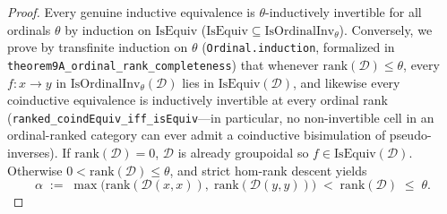 \documentclass[10pt,twoside,openright]{book}
\theoremstyle{crmplain}
\theoremstyle{crmdef}
\theoremstyle{crmremark}
\begin{document}
\begin{proof}
Every genuine inductive equivalence is $\theta$-inductively invertible for all ordinals $\theta$ by induction on $\mathrm{IsEquiv}$ ($\mathrm{IsEquiv} \subseteq \mathrm{IsOrdinalInv}_\theta$). Conversely, we prove by transfinite induction on $\theta$ (\texttt{Ordinal.induction}, formalized in \texttt{theorem9A\_\allowbreak ordinal\_\allowbreak rank\_\allowbreak completeness}) that whenever $\mathrm{rank}(\mathcal{D}) \le \theta$, every $f : x \to y$ in $\mathrm{IsOrdinalInv}_\theta(\mathcal{D})$ lies in $\mathrm{IsEquiv}(\mathcal{D})$, and likewise every coinductive equivalence is inductively invertible at every ordinal rank (\texttt{ranked\_\allowbreak coindEquiv\_\allowbreak iff\_\allowbreak isEquiv}---in particular, no non-invertible cell in an ordinal-ranked category can ever admit a coinductive bisimulation of pseudo-inverses). If $\mathrm{rank}(\mathcal{D}) = 0$, $\mathcal{D}$ is already groupoidal so $f \in \mathrm{IsEquiv}(\mathcal{D})$. Otherwise $0 < \mathrm{rank}(\mathcal{D}) \le \theta$, and strict hom-rank descent yields
\[
  \alpha \;:=\; \max\bigl(\mathrm{rank}(\mathcal{D}(x, x)),\; \mathrm{rank}(\mathcal{D}(y, y))\bigr) \;<\; \mathrm{rank}(\mathcal{D}) \;\le\; \theta.
\]

\end{proof}
\end{document}

